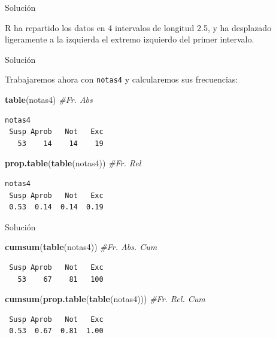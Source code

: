 \documentclass[
  ignorenonframetext,
]{beamer}
\newenvironment{Shaded}{\begin{snugshade}}{\end{snugshade}}
\newcommand{\CommentTok}[1]{\textcolor[rgb]{0.56,0.35,0.01}{\textit{#1}}}
\newcommand{\KeywordTok}[1]{\textcolor[rgb]{0.13,0.29,0.53}{\textbf{#1}}}
\newcommand{\NormalTok}[1]{#1}
\begin{document}
\begin{frame}{Solución}
\protect\hypertarget{soluciuxf3n-24}{}

R ha repartido los datos en 4 intervalos de longitud 2.5, y ha
desplazado ligeramente a la izquierda el extremo izquierdo del primer
intervalo.

\end{frame}

\begin{frame}[fragile]{Solución}
\protect\hypertarget{soluciuxf3n-25}{}

Trabajaremos ahora con \texttt{notas4} y calcularemos sus frecuencias:

\begin{Shaded}
\begin{Highlighting}[]
\KeywordTok{table}\NormalTok{(notas4) }\CommentTok{#Fr. Abs}
\end{Highlighting}
\end{Shaded}

\begin{verbatim}
notas4
 Susp Aprob   Not   Exc 
   53    14    14    19 
\end{verbatim}

\begin{Shaded}
\begin{Highlighting}[]
\KeywordTok{prop.table}\NormalTok{(}\KeywordTok{table}\NormalTok{(notas4)) }\CommentTok{#Fr. Rel}
\end{Highlighting}
\end{Shaded}

\begin{verbatim}
notas4
 Susp Aprob   Not   Exc 
 0.53  0.14  0.14  0.19 
\end{verbatim}

\end{frame}

\begin{frame}[fragile]{Solución}
\protect\hypertarget{soluciuxf3n-26}{}

\begin{Shaded}
\begin{Highlighting}[]
\KeywordTok{cumsum}\NormalTok{(}\KeywordTok{table}\NormalTok{(notas4)) }\CommentTok{#Fr. Abs. Cum}
\end{Highlighting}
\end{Shaded}

\begin{verbatim}
 Susp Aprob   Not   Exc 
   53    67    81   100 
\end{verbatim}

\begin{Shaded}
\begin{Highlighting}[]
\KeywordTok{cumsum}\NormalTok{(}\KeywordTok{prop.table}\NormalTok{(}\KeywordTok{table}\NormalTok{(notas4))) }\CommentTok{#Fr. Rel. Cum}
\end{Highlighting}
\end{Shaded}

\begin{verbatim}
 Susp Aprob   Not   Exc 
 0.53  0.67  0.81  1.00 
\end{verbatim}

\end{frame}
\end{document}
